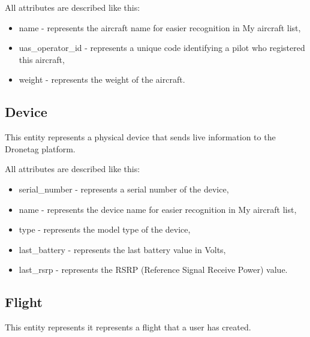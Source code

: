 All attributes are described like this:
\begin{itemize}
    \item name - represents the aircraft name for easier recognition in My aircraft list,
    \item uas\_operator\_id - represents a unique code identifying a pilot who registered this aircraft,
    \item weight - represents the weight of the aircraft.
\end{itemize}

\subsection{Device}\label{subsec:device}
This entity represents a physical device that sends live information to the Dronetag platform.

All attributes are described like this:
\begin{itemize}
    \item serial\_number - represents a serial number of the device,
    \item name - represents the device name for easier recognition in My aircraft list,
    \item type - represents the model type of the device,
    \item last\_battery - represents the last battery value in Volts,
    \item last\_rsrp - represents the RSRP (Reference Signal Receive Power) value.
\end{itemize}

\subsection{Flight}\label{subsec:flight}
This entity represents it represents a flight that a user has created.

